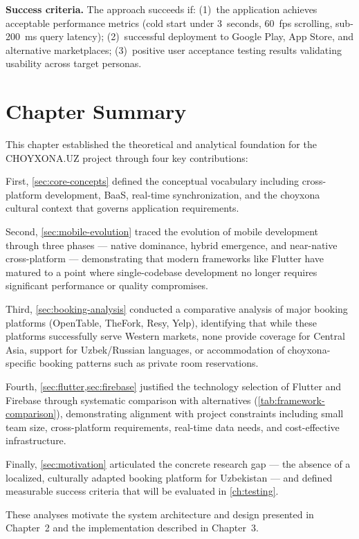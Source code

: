 \textbf{Success criteria.}
The approach succeeds if: (1)~the application achieves acceptable performance metrics (cold start under 3~seconds, 60~fps scrolling, sub-200~ms query latency); (2)~successful deployment to Google Play, App Store, and alternative marketplaces; (3)~positive user acceptance testing results validating usability across target personas.


\section{Chapter Summary}
\label{sec:ch1-summary}

This chapter established the theoretical and analytical foundation for the CHOYXONA.UZ project through four key contributions:

First, \cref{sec:core-concepts} defined the conceptual vocabulary including cross-platform development, BaaS, real-time synchronization, and the choyxona cultural context that governs application requirements.

Second, \cref{sec:mobile-evolution} traced the evolution of mobile development through three phases --- native dominance, hybrid emergence, and near-native cross-platform --- demonstrating that modern frameworks like Flutter have matured to a point where single-codebase development no longer requires significant performance or quality compromises.

Third, \cref{sec:booking-analysis} conducted a comparative analysis of major booking platforms (OpenTable, TheFork, Resy, Yelp), identifying that while these platforms successfully serve Western markets, none provide coverage for Central Asia, support for Uzbek/Russian languages, or accommodation of choyxona-specific booking patterns such as private room reservations.

Fourth, \cref{sec:flutter,sec:firebase} justified the technology selection of Flutter and Firebase through systematic comparison with alternatives (\cref{tab:framework-comparison}), demonstrating alignment with project constraints including small team size, cross-platform requirements, real-time data needs, and cost-effective infrastructure.

Finally, \cref{sec:motivation} articulated the concrete research gap --- the absence of a localized, culturally adapted booking platform for Uzbekistan --- and defined measurable success criteria that will be evaluated in \cref{ch:testing}.

These analyses motivate the system architecture and design presented in Chapter~2 and the implementation described in Chapter~3.
